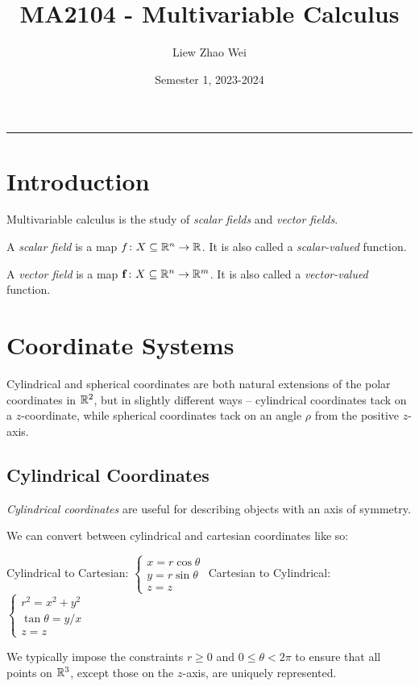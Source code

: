 \documentclass{article}
\title{MA2104 - Multivariable Calculus}
\author{Liew Zhao Wei}
\date{Semester 1, 2023-2024}
\begin{document}
\maketitle
\hrule

\section{Introduction}

Multivariable calculus is the study of \emph{scalar fields} and \emph{vector fields}.

\begin{definition}
  A \emph{scalar field} is a map $f \colon X \subseteq \mathbb{R}^n \to \mathbb{R}$.
  It is also called a \emph{scalar-valued} function.
\end{definition}

\begin{definition}
  A \emph{vector field} is a map $\mathbf{f} \colon X \subseteq \mathbb{R}^n \to \mathbb{R}^m$.
  It is also called a \emph{vector-valued} function.
\end{definition}

\section{Coordinate Systems}

Cylindrical and spherical coordinates are both natural extensions of the polar coordinates in $\mathbb{R}^2$, but in slightly different ways -- cylindrical coordinates tack on a $z$-coordinate, while spherical coordinates tack on an angle $\rho$ from the positive $z$-axis.

\subsection{Cylindrical Coordinates}

\emph{Cylindrical coordinates} are useful for describing objects with an axis of symmetry.

\begin{definition}
  We can convert between cylindrical and cartesian coordinates like so:

  Cylindrical to Cartesian: $
    \begin{cases}
      x  = r\cos\theta
      \\
      y  = r\sin\theta
      \\
      z = z
    \end{cases}
  $
  Cartesian to Cylindrical: $
    \begin{cases}
      r^2 = x^2 + y^2
      \\
      \tan{\theta}  = y / x
      \\
      z = z
    \end{cases}
  $
\end{definition}
We typically impose the constraints $r \geq 0$ and $0 \leq \theta < 2\pi$ to ensure that all points on $\mathbb{R}^3$, except those on the $z$-axis, are uniquely represented.
\end{document}
